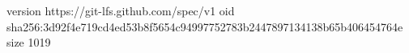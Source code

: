 version https://git-lfs.github.com/spec/v1
oid sha256:3d92f4e719cd4ed53b8f5654c94997752783b2447897134138b65b406454764e
size 1019
